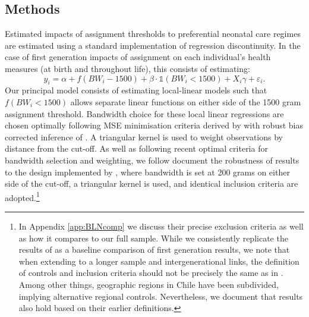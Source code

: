 \documentclass[11pt]{article}
\begin{document}
\begin{spacing}{1.5}
  

  
  \clearpage
  \section{Methods}

  Estimated impacts of assignment thresholds to preferential neonatal care regimes are estimated using a standard implementation of regression discontinuity.  In the case of first generation impacts of assignment on each individual's health measures (at birth and throughout life), this consists of estimating:
  \begin{equation}
    y_i = \alpha + f(BW_i-1500) + \beta \cdot \mathbb{1}(BW_i<1500)+X_i\gamma + \varepsilon_i.
  \end{equation}
  Our principal model consists of estimating local-linear models such that $f(BW_i<1500)$ allows separate linear functions on either side of the 1500 gram assignment threshold.  Bandwidth choice for these local linear regressions are chosen optimally following MSE minimisation criteria derived by \citet{Calonicoetal2020a} with robust bias corrected inference of \citet{Calonicoetal2014}.  A triangular kernel is used to weight observations by distance from the cut-off.  As well as following recent optimal criteria for bandwidth selection and weighting, we follow document the robustness of results to the design implemented by \citet{Bharadwajetal2013}, where bandwidth is set at 200 grams on either side of the cut-off, a triangular kernel is used, and identical inclusion criteria are adopted.\footnote{In Appendix \ref{app:BLNcomp} we discuss their precise exclusion criteria as well as how it compares to our full sample.  While we consistently replicate the results of \citet{Bharadwajetal2013} as a baseline comparison of first generation results, we note that when extending to a longer sample and intergenerational links, the definition of controls and inclusion criteria should not be precisely the same as in \citet{Bharadwajetal2013}.  Among other things, geographic regions in Chile have been subdivided, implying alternative regional controls.  Nevertheless, we document that results also hold based on their earlier definitions.}  


  
  \citet{Almondetal2010}
  
  \citet{Barrecaetal2011}

  \citet{RomanoWolf2005}

  \citet{GelmanImbens2019}
  

\end{spacing}
\end{document}
